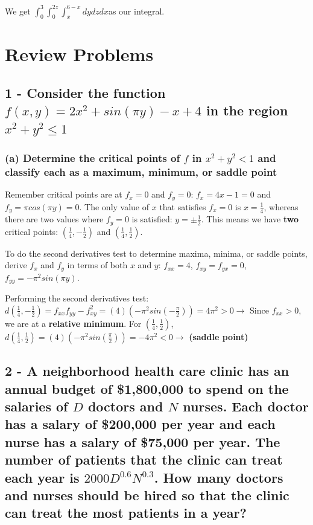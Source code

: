 \documentclass{article}
\begin{document}
\par\noindent\large We get \Large$\int_{0}^{3}\int_{0}^{2z}\int_{x}^{6 - x}dydzdx$\large  as our integral.

\section{Review Problems}
\subsection{1 - Consider the function $f(x, y) = 2x^{2} + sin(\pi y) - x + 4$ in the region $x^{2} + y^{2} \leq 1$}
\subsubsection{(a) Determine the critical points of $f$ in $x^{2} + y^{2} < 1$ and classify each as a maximum, minimum, or saddle point}

\par\noindent\large Remember critical points are at $f_{x} = 0$ and $f_{y} = 0$: $f_{x} = 4x - 1 = 0$ and $f_{y} = \pi cos(\pi y) = 0$.  The only value of $x$ that satisfies $f_{x} = 0$ is $x = \frac{1}{4}$, whereas there are two values where $f_{y} = 0$ is satisfied: $y = \pm\frac{1}{2}$.  This means we have \textbf{two} critical points: $(\frac{1}{4}, -\frac{1}{2})$ and $(\frac{1}{4}, \frac{1}{2})$.\vspace{0.25cm}

\par\noindent\large To do the second derivatives test to determine maxima, minima, or saddle points, derive $f_{x}$ and $f_{y}$ in terms of both $x$ and $y$: $f_{xx} = 4$, $f_{xy} = f_{yx} = 0$, $f_{yy} = -\pi^{2}sin(\pi y)$.\vspace{0.25cm}

\par\noindent\large Performing the second derivatives test: $d(\frac{1}{4}, -\frac{1}{2}) = f_{xx}f_{yy} - f_{xy}^{2} = (4)(-\pi^{2}sin(-\frac{\pi}{2})) = 4\pi^{2} > 0 \rightarrow$ Since $f_{xx} > 0$, we are at a \textbf{relative minimum}. For $(\frac{1}{4}, \frac{1}{2})$, $d(\frac{1}{4}, \frac{1}{2}) = (4)(-\pi^{2}sin(\frac{\pi}{2})) = -4\pi^{2} < 0 \rightarrow$ \textbf{(saddle point)}

\subsection{2 - A neighborhood health care clinic has an annual budget of \$1,800,000 to spend on the salaries of $D$ doctors and $N$ nurses.  Each doctor has a salary of \$200,000 per year and each nurse has a salary of \$75,000 per year.  The number of patients that the clinic can treat each year is $2000D^{0.6}N^{0.3}$.  How many doctors and nurses should be hired so that the clinic can treat the most patients in a year?}
\end{document}
